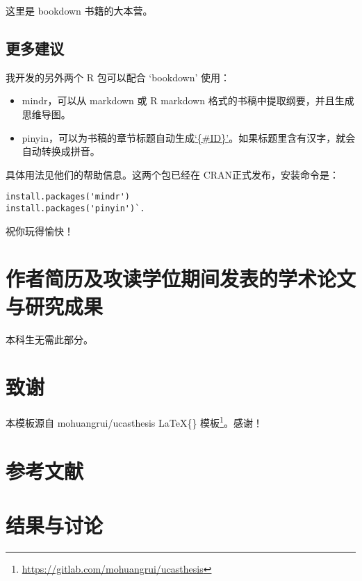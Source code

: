 \documentclass[doublesided]{Style/ucasthesis}%
\begin{document}
这里是 bookdown 书籍的大本营。

\hypertarget{section-8}{%
\section{更多建议}\label{section-8}}

我开发的另外两个 R 包可以配合 `bookdown' 使用：

\begin{itemize}
\item
  mindr，可以从 markdown 或 R markdown 格式的书稿中提取纲要，并且生成思维导图。
\item
  pinyin，可以为书稿的章节标题自动生成\href{https://bookdown.org/yihui/bookdown/cross-references.html}{`\{\#ID\}'}。如果标题里含有汉字，就会自动转换成拼音。
\end{itemize}

具体用法见他们的帮助信息。这两个包已经在 CRAN正式发布，安装命令是：

\begin{verbatim}
install.packages('mindr')
install.packages('pinyin')`.
\end{verbatim}

祝你玩得愉快！

\backmatter

\hypertarget{section-9}{%
\chapter{作者简历及攻读学位期间发表的学术论文与研究成果}\label{section-9}}

本科生无需此部分。

\hypertarget{section-10}{%
\chapter{致谢}\label{section-10}}

本模板源自 mohuangrui/ucasthesis \LaTeX\{\} 模板\footnote{\url{https://gitlab.com/mohuangrui/ucasthesis}}。感谢！

\hypertarget{section-11}{%
\chapter{参考文献}\label{section-11}}



\backmatter

\hypertarget{results}{%
\chapter{结果与讨论}\label{results}}
\end{document}
